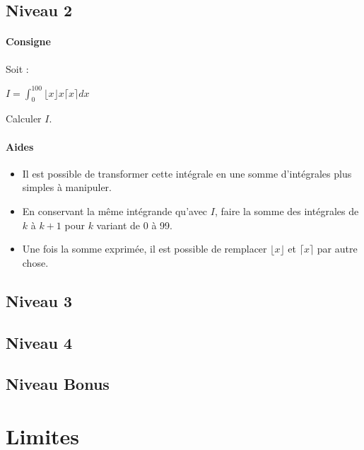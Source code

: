 \documentclass[a4paper]{report}
\newcounter{exnumber}
\begin{document}
			\subsection{Niveau 2}
				\begin{tcolorbox}[colback=white,colframe=black,title=Exercice n°\arabic{exnumber} - Intégrales et arrondis]
					\paragraph{Consigne}
						Soit :
						\begin{center}
							$I = \int_{0}^{100}\lfloor x \rfloor x \lceil x \rceil dx$
						\end{center}
						Calculer $I$.
						
					\tcblower					
					
					\paragraph{Aides}
						\begin{itemize}
							\item Il est possible de transformer cette intégrale en une somme d'intégrales plus simples à manipuler.
							\item En conservant la même intégrande qu'avec $I$, faire la somme des intégrales de $k$ à $k+1$ pour $k$ variant de 0 à 99.	
							\item Une fois la somme exprimée, il est possible de remplacer $\lfloor x \rfloor$ et $\lceil x \rceil$ par autre chose.			
						\end{itemize}	
				\end{tcolorbox}
				\addtocounter{exnumber}{1}									
		
			\subsection{Niveau 3}
			
			\subsection{Niveau 4}
			
			\subsection{Niveau Bonus}
			
		\section{Limites}
		
\end{document}
